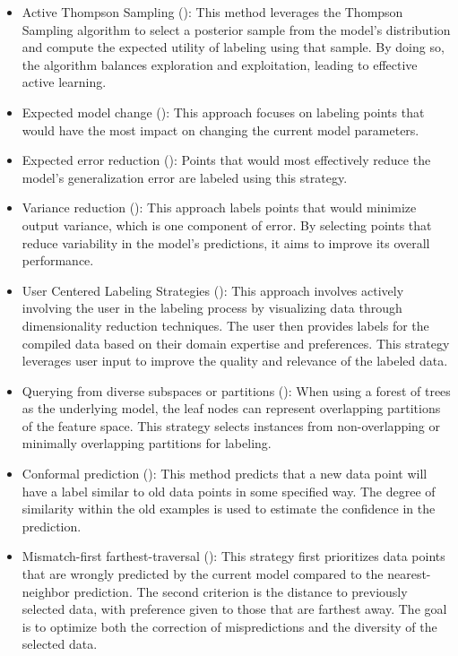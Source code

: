 \documentclass[
  letterpaper,
  numbers=noenddot,
  DIV=11,
  oneside]{scrreprt}
\theoremstyle{remark}
\begin{document}
\begin{itemize}
\item
  Active Thompson Sampling (): This method leverages the Thompson Sampling algorithm
  to select a posterior sample from the model's distribution and compute
  the expected utility of labeling using that sample. By doing so, the
  algorithm balances exploration and exploitation, leading to effective
  active learning.
\item
  Expected model change (): This approach focuses on labeling points that would
  have the most impact on changing the current model parameters.
\item
  Expected error reduction (): Points that would most effectively reduce the model's
  generalization error are labeled using this strategy.
\item
  Variance reduction (): This approach labels points that would minimize output
  variance, which is one component of error. By selecting points that
  reduce variability in the model's predictions, it aims to improve its
  overall performance.
\item
  User Centered Labeling Strategies
  (): This approach
  involves actively involving the user in the labeling process by
  visualizing data through dimensionality reduction techniques. The user
  then provides labels for the compiled data based on their domain
  expertise and preferences. This strategy leverages user input to
  improve the quality and relevance of the labeled data.
\item
  Querying from diverse subspaces or partitions
  (): When using a forest of
  trees as the underlying model, the leaf nodes can represent
  overlapping partitions of the feature space. This strategy selects
  instances from non-overlapping or minimally overlapping partitions for
  labeling.
\item
  Conformal prediction (): This method predicts that a new data point will
  have a label similar to old data points in some specified way. The
  degree of similarity within the old examples is used to estimate the
  confidence in the prediction.
\item
  Mismatch-first farthest-traversal (): This strategy first prioritizes data
  points that are wrongly predicted by the current model compared to the
  nearest-neighbor prediction. The second criterion is the distance to
  previously selected data, with preference given to those that are
  farthest away. The goal is to optimize both the correction of
  mispredictions and the diversity of the selected data.
\end{itemize}
\end{document}
